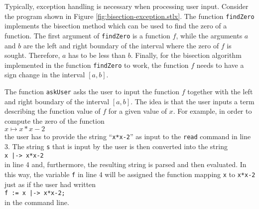 Typically, exception handling is necessary when  processing user input.  Consider the program
shown in Figure \ref{fig:bisection-exception.stlx}.  The function \texttt{findZero} implements
the bisection method which can be used to find the zero of a function.  The first argument of
\texttt{findZero} is a function $f$, while the arguments $a$ and $b$ are the left and right
boundary of the interval where the zero of $f$ is sought.  Therefore, $a$ has to be less than
$b$.  Finally, for the bisection algorithm implemented in the function \texttt{findZero} to
work, the function $f$ needs to have a sign change in the interval $[a,b]$.  

The function \texttt{askUser} asks the user to input the function $f$ together with the left and
right boundary of the interval $[a,b]$.  The idea is that the user inputs a term describing the
function value of $f$ for a given value of $x$.  For example, in order to compute the zero of the
function
\\[0.2cm]
\hspace*{1.3cm}
$x \mapsto x*x - 2$
\\[0.2cm]
the user has to provide the string ``\texttt{x*x-2}'' as input to the \texttt{read} command in
line 3.  The string \texttt{s} that is input by the user is then converted into the string
\\[0.2cm]
\hspace*{1.3cm}
\texttt{x |-> x*x-2}
\\[0.2cm]
in line 4 and, furthermore, the resulting string is parsed and then evaluated.  In this way, the
variable \texttt{f} in line 4 will be assigned the function mapping \texttt{x} to \texttt{x*x-2}
just as if the user had written
\\[0.2cm]
\hspace*{1.3cm}
\texttt{f := x |-> x*x-2;}
\\[0.2cm]
in the command line.


